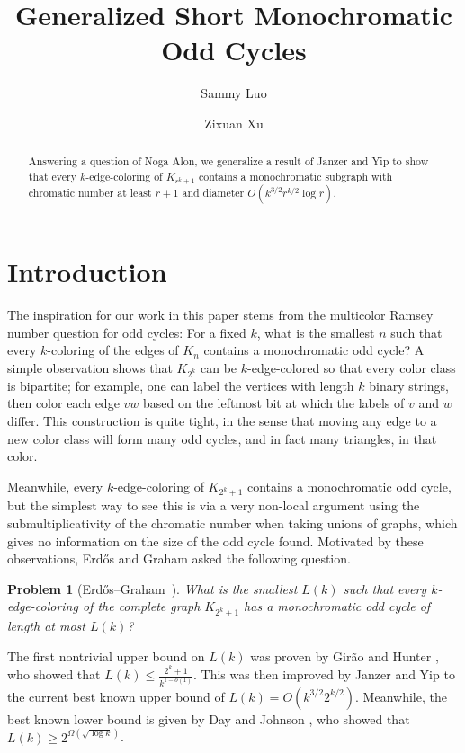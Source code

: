 \documentclass[reqno]{amsart}
\title
{Generalized Short Monochromatic Odd Cycles}
\author{Sammy Luo}
\author{Zixuan Xu}
\newtheorem{problem}[theorem]{Problem}
\theoremstyle{remark}
\theoremstyle{definition}
\numberwithin{theorem}{section}
\renewcommand{\le}{\leqslant}
\renewcommand{\ge}{\geqslant}
\begin{document}
\maketitle
\vspace{-1.2em}

\begin{abstract}
    Answering a question of Noga Alon, we generalize a result of Janzer and Yip to show that every $k$-edge-coloring of $K_{r^k+1}$ contains a monochromatic subgraph with chromatic number at least $r+1$ and diameter $O(k^{3/2}r^{k/2}\log r)$.
\end{abstract}

\section{Introduction}
The inspiration for our work in this paper stems from the multicolor Ramsey number question for odd cycles: For a fixed $k$, what is the smallest $n$ such that every $k$-coloring of the edges of $K_n$ contains a monochromatic odd cycle? A simple observation shows that $K_{2^k}$ can be $k$-edge-colored so that every color class is bipartite; for example, one can label the vertices with length $k$ binary strings, then color each edge $vw$ based on the leftmost bit at which the labels of $v$ and $w$ differ. This construction is quite tight, in the sense that moving any edge to a new color class will form many odd cycles, and in fact many triangles, in that color.

Meanwhile, every $k$-edge-coloring of $K_{2^k+1}$ contains a monochromatic odd cycle, but the simplest way to see this is via a very non-local argument using the submultiplicativity of the chromatic number when taking unions of graphs, which gives no information on the size of the odd cycle found. 
Motivated by these observations, Erd\H{o}s and Graham asked the following question.

\begin{problem}[Erd\H{o}s--Graham~\cite{ErdosGraham1975PartitionTheorems}]\label{problem:odd-cycle}
    What is the smallest $L(k)$ such that every $k$-edge-coloring of the complete graph $K_{2^k+1}$ has a monochromatic odd cycle of length at most $L(k)$?
\end{problem}

The first nontrivial upper bound on $L(k)$ was proven by Gir\~ao and Hunter \cite{girão2024monochromaticoddcyclesedgecoloured}, who showed that $L(k)\le \frac{2^k+1}{k^{1-o(1)}}$. This was then improved by Janzer and Yip \cite{JanzerYip2026ShortMonochromaticOddCycles} to the current best known upper bound of $L(k)=O(k^{3/2}2^{k/2})$. Meanwhile, the best known lower bound is given by Day and Johnson \cite{DayJohnson2017MulticolourRamseyOddCycles}, who showed that $L(k)\ge 2^{\Omega(\sqrt{\log k})}$.
\end{document}
